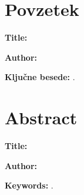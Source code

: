 \label{ch:abstract}

\chapter*{Povzetek}
\noindent\textbf{Title:} \tTitle

\bigskip

\noindent\textbf{Author:} \tAuthor

\bigskip

\noindent
\lipsum[1] %

\bigskip
\noindent\textbf{Ključne besede:} \tKeywords.

\chapter*{Abstract}
\noindent\textbf{Title:} \tTitleEn

\bigskip

\noindent\textbf{Author:} \tAuthor

\bigskip

\noindent
\lipsum[1] %

\bigskip
\noindent\textbf{Keywords:} \tKeywordsEn.

\clearemptydoublepage



